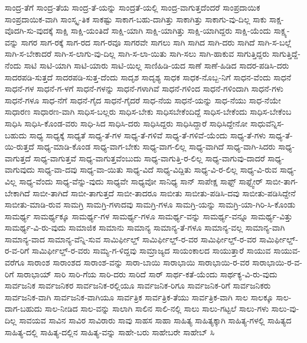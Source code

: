 {ಸಾಂದ್ರ-ತೆಗೆ
ಸಾಂದ್ರ-ತೆಯ
ಸಾಂದ್ರ-ತೆ-ಯನ್ನು
ಸಾಂದ್ರತೆ-ಯಲ್ಲಿ
ಸಾಂದ್ರ-ವಾಗುತ್ತದೆಂದರೆ
ಸಾಂಪ್ರದಾಯಿಕ
ಸಾಂಪ್ರದಾಯಿಕ-ವಾಗಿ
ಸಾಂಸ್ಕೃ-ತಿಕ
ಸಾಕಷ್ಟು
ಸಾಕಾಗ-ಬಹು-ದಾಗಿತ್ತು
ಸಾಕಾಗಿತ್ತು
ಸಾಕಾಗು-ವು-ದಿಲ್ಲ
ಸಾಕು
ಸಾಕ್ಷ-ವೊದಗಿ-ಸು-ವುದಕ್ಕೆ
ಸಾಕ್ಷಿ
ಸಾಕ್ಷಿ-ಯಂತಿದೆ
ಸಾಕ್ಷಿ-ಯಾಗಿ
ಸಾಕ್ಷಿ-ಯಾಗಿತ್ತು
ಸಾಕ್ಷಿ-ಯಾಗಿದ್ದರು
ಸಾಕ್ಷಿ-ಯೆಂದು
ಸಾಕ್ಷ್ಯ-ವನ್ನು
ಸಾಗರ
ಸಾಗ-ರಕ್ಕೆ
ಸಾಗ-ರದ
ಸಾಗ-ರವೂ
ಸಾಗರವೇ
ಸಾಗಲು
ಸಾಗಿ
ಸಾಗಿದ
ಸಾಗಿ-ದರು
ಸಾಗಿದೆ
ಸಾಗಿ-ಸ-ಬಲ್ಲೆ
ಸಾಗಿ-ಸ-ಬೇಕಾದರೆ
ಸಾಗಿ-ಸ-ಲಾಗು-ವು-ದಿಲ್ಲ
ಸಾಗಿ-ಸ-ಲಾ-ಯಿತು
ಸಾಗಿ-ಸಲು
ಸಾಗಿ-ಹಾಕುವ
ಸಾಗುತ್ತಿದ್ದರು
ಸಾಗುತ್ತಿದ್ದೆ-ನೆಂದು
ಸಾಟಿ
ಸಾಟಿ-ಯಾಗಿ
ಸಾಟಿ-ಯಾರು
ಸಾಟಿ-ಯಿಲ್ಲ
ಸಾಣಿಹಿಡಿ-ಯದ
ಸಾಣೆ
ಸಾಣೆ-ಹಿಡಿದ
ಸಾದರ-ಪಡಿಸಿ-ದರು
ಸಾದರಪಡಿ-ಸುತ್ತದೆ
ಸಾದರಪಡಿ-ಸುತ್ತ-ದೆಂದು
ಸಾದೃಶ
ಸಾದೃಶ್ಯ
ಸಾಧಕ
ಸಾಧಕ-ನೊಬ್ಬ-ನಿಗೆ
ಸಾಧನ-ವೆಂದು
ಸಾಧನೆ
ಸಾಧನೆ-ಗಳ
ಸಾಧನೆ-ಗ-ಳಗೆ
ಸಾಧನೆ-ಗಳನ್ನು
ಸಾಧನೆ-ಗಳಾಗಿವೆ
ಸಾಧನೆ-ಗಳಿಂದ
ಸಾಧನೆ-ಗಳಿಂದಾಗಿ
ಸಾಧನೆ-ಗಳು
ಸಾಧನೆ-ಗಳೂ
ಸಾಧ-ನೆಗೆ
ಸಾಧನೆ-ಗೈದ
ಸಾಧನೆ-ಗೈದರೆ
ಸಾಧ-ನೆಯ
ಸಾಧನೆ-ಯನ್ನು
ಸಾಧ-ನೆಯು
ಸಾಧ-ನೆಯೇ
ಸಾಧಾರಣ
ಸಾಧಾರಣ-ವಾಗಿ
ಸಾಧಿಸ-ಬಲ್ಲರು
ಸಾಧಿಸ-ಬೇಕು
ಸಾಧಿಸಬೇಕೆಂದಿದ್ದೆ
ಸಾಧಿಸ-ಬೇಕೆಂದು
ಸಾಧಿಸ-ಬೇಕೆಂಬ
ಸಾಧಿಸಿ
ಸಾಧಿಸಿ-ಕೊಂಡ-ವರು
ಸಾಧಿ-ಸಿದ
ಸಾಧಿಸಿ-ದರು
ಸಾಧಿಸಿದ್ದರು
ಸಾಧಿಸಿದ್ದಾರೆ
ಸಾಧಿಸಿದ್ದೇನೋ
ಸಾಧುವೆನ್ನಿಸ-ಬಹುದು
ಸಾಧ್ಯ
ಸಾಧ್ಯಕ್ಕೆ
ಸಾಧ್ಯತೆ
ಸಾಧ್ಯ-ತೆ-ಗಳ
ಸಾಧ್ಯ-ತೆ-ಗಳಿವೆ
ಸಾಧ್ಯ-ತೆ-ಗಳಿವೆ-ಯೆಂದು
ಸಾಧ್ಯ-ತೆ-ಗಳು
ಸಾಧ್ಯ-ತೆ-ಯಿ-ರುತ್ತದೆ
ಸಾಧ್ಯ-ಮಾಡಿ-ಕೊಂಡ
ಸಾಧ್ಯ-ವಾಗ-ಬೇಕು
ಸಾಧ್ಯ-ವಾಗ-ಲಿಲ್ಲ
ಸಾಧ್ಯ-ವಾಗಿದೆ
ಸಾಧ್ಯ-ವಾಗಿ-ಸಿದರು
ಸಾಧ್ಯ-ವಾಗುತ್ತದೆ
ಸಾಧ್ಯ-ವಾಗುತ್ತವೆ
ಸಾಧ್ಯ-ವಾಗುತ್ತವೆಂಬುದು
ಸಾಧ್ಯ-ವಾಗುತ್ತಿ-ರ-ಲಿಲ್ಲ
ಸಾಧ್ಯ-ವಾಗುವು-ದಾದರೆ
ಸಾಧ್ಯ-ವಾಗುವುದು
ಸಾಧ್ಯ-ವಾ-ದವು
ಸಾಧ್ಯ-ವಾ-ಯಿತು
ಸಾಧ್ಯ-ವಿದೆ
ಸಾಧ್ಯ-ವಿದ್ದಿತು
ಸಾಧ್ಯ-ವಿ-ರ-ಲಿಲ್ಲ
ಸಾಧ್ಯ-ವಿ-ರುವ
ಸಾಧ್ಯ-ವಿಲ್ಲ
ಸಾಧ್ಯ-ವೆಂದು
ಸಾಧ್ಯ-ವೆನ್ನು-ವುದು
ಸಾಧ್ಯವೇ
ಸಾಧ್ಯವೋ
ಸಾನಿಧ್ಯ
ಸಾನ್
ಸಾಪೇಕ್ಷ
ಸಾಫ್ಟ್
ಸಾಫ್ಟ್ವೇರ್
ಸಾಬೀ-ತಾಗ-ಬೇಕಾಗಿದೆ
ಸಾಬೀ-ತಾಗಿದೆ
ಸಾಬೀ-ತಾಗುತ್ತದೆ
ಸಾಬೀ-ತಾದರೂ
ಸಾಬೀತು
ಸಾಬೀತು-ಪಡಿಸಿ-ದವು
ಸಾಬೀತು-ಪಡಿಸಿದ್ದೇನೆ
ಸಾಬೀತು-ಮಾಡಿ-ರುವ
ಸಾಮಗ್ರಿ
ಸಾಮಗ್ರಿ-ಗಳಾದವು
ಸಾಮಗ್ರಿ-ಗಳೂ
ಸಾಮಗ್ರಿ-ಯನ್ನು
ಸಾಮಗ್ರಿ-ಯಾ-ಗಿರಿ-ಸಿ-ಕೊಂಡು
ಸಾಮರ್ಥ್ಯ
ಸಾಮರ್ಥ್ಯಕ್ಕೂ
ಸಾಮರ್ಥ್ಯ-ಗಳ
ಸಾಮರ್ಥ್ಯ-ಗಳೂ
ಸಾಮರ್ಥ್ಯ-ವನ್ನು
ಸಾಮರ್ಥ್ಯ-ವನ್ನೂ
ಸಾಮರ್ಥ್ಯ-ವಿತ್ತು
ಸಾಮರ್ಥ್ಯ-ವಿ-ರು-ವುದು
ಸಾಮಾಜಿಕ
ಸಾಮಾನು
ಸಾಮಾನ್ಯ
ಸಾಮಾನ್ಯ-ತೆ-ಗಳೂ
ಸಾಮಾನ್ಯ-ವಲ್ಲ
ಸಾಮಾನ್ಯ-ವಾಗಿ
ಸಾಮಾನ್ಯ-ವಾದ
ಸಾಮಾನ್ಯ-ವೆನ್ನಿ-ಸುವ
ಸಾಮಿರ್ಫೀಲ್ಡ್
ಸಾಮಿರ್ಫೀಲ್ಡ್-ರ-ವರ
ಸಾಮಿರ್ಫೀಲ್ಡ್-ರ-ವರ
ಸಾಮಿರ್ಫೀಲ್ಡ್-ರ-ವ-ರಿಗೆ
ಸಾಮಿರ್ಫೀಲ್ಡ್-ರ-ವರು
ಸಾಮ್ಯ-ಗ-ಳಿದ್ದವು
ಸಾಮ್ರಾಜ್ಯದ
ಸಾಯಂಕಾಲದ
ಸಾಯುತ್ತಾರೆ
ಸಾಯುವ
ಸಾಯುವ-ವರೆಗೂ
ಸಾರಾಂಶ
ಸಾರಾಂಶದ
ಸಾರಾಂಶ-ವನ್ನು
ಸಾರಾ-ಬಾಯಿ
ಸಾರಾಭಾಯಿ
ಸಾರಾಭಾಯಿ-ರ-ವರ
ಸಾರಾಭಾಯಿ-ರ-ವ-ರಿಗೆ
ಸಾರಾಭಾಯ್
ಸಾರಿ
ಸಾರಿ-ಗೆಯ
ಸಾರಿ-ದರು
ಸಾರಿದೆ
ಸಾರ್
ಸಾರ್ಥ-ಕತೆ-ಯೆಂದು
ಸಾರ್ಥಕ್ಯ-ವಿ-ರು-ವುದು
ಸಾರ್ವಜನಿಕ
ಸಾರ್ವಜನಿಕರ
ಸಾರ್ವಜನಿಕ-ರಲ್ಲಿಯೂ
ಸಾರ್ವಜನಿಕ-ರಿಗೂ
ಸಾರ್ವಜನಿಕ-ರಿಗೆ
ಸಾರ್ವಜನಿಕರು
ಸಾರ್ವಜನಿಕ-ವಾಗಿ
ಸಾರ್ವಜನಿಕ-ವಾಗಿಯೂ
ಸಾರ್ವತ್ರಿಕ
ಸಾರ್ವತ್ರಿಕ-ತೆಯು
ಸಾರ್ವತ್ರಿಕ-ವಾಗಿ
ಸಾಲ
ಸಾಲಕ್ಕೂ
ಸಾಲ-ದಾಗ-ಬಹುದು
ಸಾಲ-ನೀಡಿದ
ಸಾಲ-ವನ್ನು
ಸಾಲಾಗಿ
ಸಾಲಿನ
ಸಾಲಿ-ನಲ್ಲಿ
ಸಾಲು
ಸಾಲು-ಗಟ್ಟಲೆ
ಸಾಲು-ಗಳು
ಸಾಲು-ವು-ದಿಲ್ಲ
ಸಾವಯವ
ಸಾವಿನ
ಸಾವಿರ
ಸಾವಿರಾರು
ಸಾವು
ಸಾಹಸ
ಸಾಹಾ
ಸಾಹಿತ್ಯ
ಸಾಹಿತ್ಯಕ್ಕಾಗಿ
ಸಾಹಿತ್ಯ-ಗಳಲ್ಲಿ
ಸಾಹಿತ್ಯದ
ಸಾಹಿತ್ಯ-ದಲ್ಲಿ
ಸಾಹಿತ್ಯ-ದಲ್ಲಿನ
ಸಾಹಿತ್ಯ-ವನ್ನು
ಸಾಹೇ-ಬರು
ಸಾಹೇಬರೇ
ಸಾಹೇಬ್
ಸಿ
}
